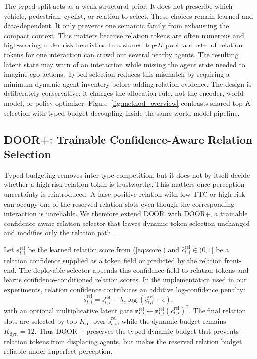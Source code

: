 \documentclass[10pt,journal,compsoc]{IEEEtran}
\newcommand{\method}{\textsc{DOOR}}
\newcommand{\doorplus}{\textsc{DOOR+}}
\begin{document}
The typed split acts as a weak structural prior. It does not prescribe which vehicle, pedestrian, cyclist, or relation to select. These choices remain learned and data-dependent. It only prevents one semantic family from exhausting the compact context. This matters because relation tokens are often numerous and high-scoring under risk heuristics. In a shared top-$K$ pool, a cluster of relation tokens for one interaction can crowd out several nearby agents. The resulting latent state may warn of an interaction while missing the agent state needed to imagine ego actions. Typed selection reduces this mismatch by requiring a minimum dynamic-agent inventory before adding relation evidence. The design is deliberately conservative: it changes the allocation rule, not the encoder, world model, or policy optimizer. Figure~\ref{fig:method_overview} contrasts shared top-$K$ selection with typed-budget decoupling inside the same world-model pipeline.

\subsection{DOOR+: Trainable Confidence-Aware Relation Selection}
Typed budgeting removes inter-type competition, but it does not by itself decide whether a high-risk relation token is trustworthy. This matters once perception uncertainty is reintroduced. A false-positive relation with low TTC or high risk can occupy one of the reserved relation slots even though the corresponding interaction is unreliable. We therefore extend \method\ with \doorplus, a trainable confidence-aware relation selector that leaves dynamic-token selection unchanged and modifies only the relation path.

Let $s^{\mathrm{rel}}_{t,i}$ be the learned relation score from (\ref{eq:score}) and $\hat{c}^{\mathrm{rel}}_{t,i}\in(0,1]$ be a relation confidence supplied as a token field or predicted by the relation front-end. The deployable selector appends this confidence field to relation tokens and learns confidence-conditioned relation scores. In the implementation used in our experiments, relation confidence contributes an additive log-confidence penalty:
\begin{equation}
\tilde{s}^{\mathrm{rel}}_{t,i}
= s^{\mathrm{rel}}_{t,i}
+ \lambda_c \log(\hat{c}^{\mathrm{rel}}_{t,i} + \epsilon),
\label{eq:doorplus_score}
\end{equation}
with an optional multiplicative latent gate $\mathbf{z}^{\mathrm{rel}}_{t,i}\leftarrow \mathbf{z}^{\mathrm{rel}}_{t,i}(\hat{c}^{\mathrm{rel}}_{t,i})^\gamma$. The final relation slots are selected by top-$K_{\mathrm{rel}}$ over $\tilde{s}^{\mathrm{rel}}_{t,i}$, while the dynamic budget remains $K_{\mathrm{dyn}}=12$. Thus \doorplus\ preserves the typed dynamic budget that prevents relation tokens from displacing agents, but makes the reserved relation budget reliable under imperfect perception.
\end{document}
